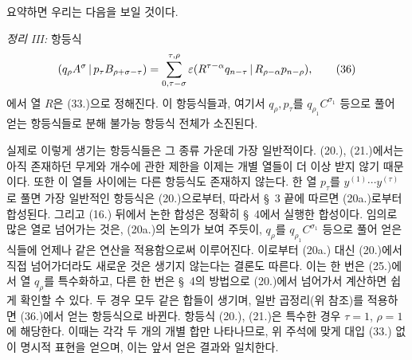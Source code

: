요약하면 우리는 다음을 보일 것이다.

\emph{정리 III:} 항등식
\begin{equation}
 (q_\rho A^\sigma\,|\,p_\tau B_{\rho+\sigma-\tau})
 =\sum_{\substack{0,\tau-\sigma}}^{\substack{\tau,\rho}}
 \varepsilon(R^{\tau-\alpha}q_{n-\tau}\,|\,R_{\rho-\alpha}p_{n-\rho}),
\tag{36}
\end{equation}
에서 열 $R$은 (33.)으로 정해진다. 이 항등식들과, 여기서 $q_\rho,p_\tau$를 $q_{\rho_1}C^{\sigma_1}$ 등으로 풀어 얻는 항등식들로 분해 불가능 항등식 전체가 소진된다.

실제로 이렇게 생기는 항등식들은 그 종류 가운데 가장 일반적이다. (20.), (21.)에서는 아직 존재하던 무게와 개수에 관한 제한을 이제는 개별 열들이 더 이상 받지 않기 때문이다. 또한 이 열들 사이에는 다른 항등식도 존재하지 않는다. 한 열 $p_\tau$를 $y^{(1)}\cdots y^{(\tau)}$로 풀면 가장 일반적인 항등식은 (20.)으로부터, 따라서 \S\ 3 끝에 따르면 (20a.)로부터 합성된다. 그리고 (16.) 뒤에서 논한 합성은 정확히 \S\ 4에서 실행한 합성이다. 임의로 많은 열로 넘어가는 것은, (20a.)의 논의가 보여 주듯이, $q_\rho$를 $q_{\rho_1}C^{\sigma_1}$ 등으로 풀어 얻은 식들에 언제나 같은 연산을 적용함으로써 이루어진다. 이로부터 (20a.) 대신 (20.)에서 직접 넘어가더라도 새로운 것은 생기지 않는다는 결론도 따른다. 이는 한 번은 (25.)에서 열 $q_\rho$를 특수화하고, 다른 한 번은 \S\ 4의 방법으로 (20.)에서 넘어가서 계산하면 쉽게 확인할 수 있다. 두 경우 모두 같은 합들이 생기며, 일반 곱정리(위 참조)를 적용하면 (36.)에서 얻는 항등식으로 바뀐다. 항등식 (20.), (21.)은 특수한 경우 $\tau=1$, $\rho=1$에 해당한다. 이때는 각각 두 개의 개별 합만 나타나므로, 위 주석에 맞게 대입 (33.) 없이 명시적 표현을 얻으며, 이는 앞서 얻은 결과와 일치한다.

